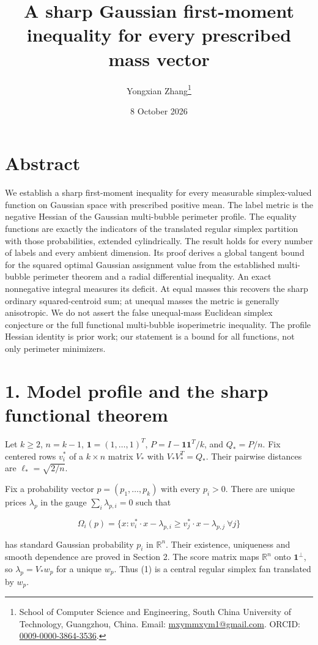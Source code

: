 \documentclass[
  11pt,
]{article}
\title{A sharp Gaussian first-moment inequality for every prescribed
mass vector}
\author{Yongxian Zhang\thanks{School of Computer Science and Engineering,
South China University of Technology, Guangzhou, China.
Email: \href{mailto:mxymmxym1@gmail.com}{mxymmxym1@gmail.com}.
ORCID: \href{https://orcid.org/0009-0000-3864-3536}{0009-0000-3864-3536}.}}
\date{8 October 2026}
\begin{document}
\maketitle

\section{Abstract}\label{abstract}

We establish a sharp first-moment inequality for every measurable
simplex-valued function on Gaussian space with prescribed positive mean.
The label metric is the negative Hessian of the Gaussian multi-bubble
perimeter profile. The equality functions are exactly the indicators of
the translated regular simplex partition with those probabilities,
extended cylindrically. The result holds for every number of labels and
every ambient dimension. Its proof derives a global tangent bound for
the squared optimal Gaussian assignment value from the established
multi-bubble perimeter theorem and a radial differential inequality. An
exact nonnegative integral measures its deficit. At equal masses this
recovers the sharp ordinary squared-centroid sum; at unequal masses the
metric is generally anisotropic. We do not assert the false unequal-mass
Euclidean simplex conjecture or the full functional multi-bubble
isoperimetric inequality. The profile Hessian identity is prior work;
our statement is a bound for all functions, not only perimeter
minimizers.

\section{1. Model profile and the sharp functional
theorem}\label{model-profile-and-the-sharp-functional-theorem}

Let \(k\ge2\), \(n=k-1\), \(\mathbf1=(1,\ldots,1)^T\),
\(P=I-\mathbf1\mathbf1^T/k\), and \(Q_*=P/n\). Fix centered rows
\(v_i^*\) of a \(k\times n\) matrix \(V_*\) with \(V_*V_*^T=Q_*\). Their
pairwise distances are \(\ell_* =\sqrt{2/n}\).

Fix a probability vector \(p=(p_1,\ldots,p_k)\) with every \(p_i>0\).
There are unique prices \(\lambda_p\) in the gauge
\(\sum_i\lambda_{p,i}=0\) such that

\[
 \Omega_i(p)=\{x:v_i^*\cdot x-\lambda_{p,i}
                   \ge v_j^*\cdot x-\lambda_{p,j}\ \forall j\}
                                                               \tag{1}
\]

has standard Gaussian probability \(p_i\) in \(\mathbb R^n\). Their
existence, uniqueness and smooth dependence are proved in Section 2. The
score matrix maps \(\mathbb R^n\) onto \(\mathbf1^\perp\), so
\(\lambda_p=V_*w_p\) for a unique \(w_p\). Thus (1) is a central regular
simplex fan translated by \(w_p\).
\end{document}
